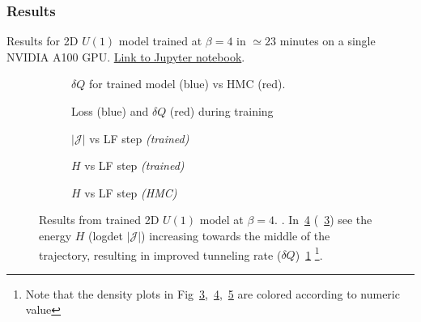\documentclass[a4paper,11pt]{article}
\begin{document}
\subsubsection{\label{subsubsec:2dResults}Results}
%
Results for 2D $U(1)$ model trained at $\beta = 4$ in $\simeq 23$ minutes on a single NVIDIA A100 GPU. \href{https://github.com/saforem2/l2hmc-qcd/blob/main/src/l2hmc/notebooks/l2hmc-2dU1.ipynb}{Link to Jupyter notebook}.
%
\begin{figure}[htpb!]
    \centering
    \hfill
    \begin{subfigure}{0.4\textwidth}
        
        \caption{\label{subfig:dqhist}$\delta Q$ for trained model (blue) vs HMC (red).}
    \end{subfigure}
    \hfill
    \begin{subfigure}{0.55\textwidth}
        
        \caption{\label{subfig:loss_dQint}Loss (blue) and $\delta Q$ (red) during training}
    \end{subfigure}
    \hfill
    \begin{subfigure}{0.31\textwidth}
        
        \caption{\label{subfig:logdet2dU1}$|\mathcal{J}|$ vs LF step \emph{(trained)}}
    \end{subfigure}
    \hfill
    \begin{subfigure}{0.31\textwidth}
        
        \caption{\label{subfig:energy2dU1}$H$ vs LF step \emph{(trained)}}
    \end{subfigure}
    \hfill
    \begin{subfigure}{0.31\textwidth}
        
        \caption{\label{subfig:energy2dU1hmc}$H$ vs LF step \emph{(HMC)}}
    \end{subfigure}
    \hfill
    \caption{\label{fig:2dU1}Results from trained 2D $U(1)$ model at $\beta = 4$. . In~\ref{subfig:energy2dU1} (~\ref{subfig:logdet2dU1}) see the energy $H$ (logdet $|\mathcal{J}|$) increasing towards the middle of the trajectory, resulting in improved tunneling rate ($\delta Q$)~\ref{subfig:dqhist} \footnote{Note that the density plots in Fig~\ref{subfig:logdet2dU1},~\ref{subfig:energy2dU1},~\ref{subfig:energy2dU1hmc} are colored according to numeric value}.}
\end{figure}
\end{document}

